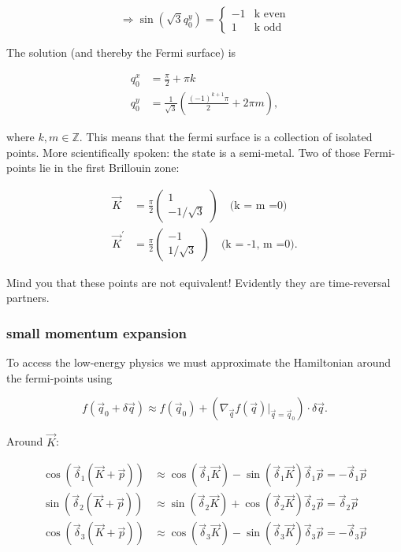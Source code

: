 \documentclass[../../../main.tex]{subfiles}
\begin{document}
\begin{equation}
	\Rightarrow \sin(\sqrt{3}q_0^y) = 
	\begin{cases}
		-1 & \text{k even} \\
		1 & \text{k odd}
	\end{cases}
\end{equation}


The solution (and thereby the Fermi surface) is 

\begin{align}
	q_0^x &= \frac{\pi}{2} + \pi k \\
	q_0^y &= \frac{1}{\sqrt{3}}\left(\frac{(-1)^{k+1}\pi}{2} + 2 \pi m\right),
\end{align}

where $k, m \in \mathbb{Z}$. This means that the fermi surface is a collection of isolated points. More scientifically spoken: the state is a semi-metal. Two of those Fermi-points lie in the first Brillouin zone:


\begin{align}
	\vec{K} &= \frac{\pi}{2} 
	\begin{pmatrix}
		1 \\
		-1/\sqrt{3}
	\end{pmatrix} \quad \text{(k = m =0)} \\
	\vec{K}^\prime &= \frac{\pi}{2}
	\begin{pmatrix}
		-1 \\
		1/\sqrt{3}
	\end{pmatrix} \quad \text{(k = -1, m =0)}.
\end{align}

Mind you that these points are not equivalent! Evidently they are time-reversal partners. 

\subsubsection{small momentum expansion}

To access the low-energy physics we must approximate the Hamiltonian around the fermi-points using

\begin{equation}
	f\left(\vec{q}_0 + \delta \vec{q}\right) \approx f(\vec{q}_0) + \left(\nabla_{\vec{q}}f(\vec{q})\rvert_{\vec{q}=\vec{q}_0}\right)\cdot\delta\vec{q}.
\end{equation}

Around $\vec{K}$:

\begin{align}
	\cos(\vec{\delta}_1(\vec{K} + \vec{p})) &\approx \cos(\vec{\delta}_1\vec{K}) - \sin(\vec{\delta}_1\vec{K})\vec{\delta}_1\vec{p} = - \vec{\delta}_1\vec{p}\\
	\sin(\vec{\delta}_2(\vec{K} + \vec{p})) &\approx \sin(\vec{\delta}_2\vec{K}) + \cos(\vec{\delta}_2\vec{K}) \vec{\delta}_2\vec{p} = \vec{\delta}_2\vec{p} \\
	\cos(\vec{\delta}_3(\vec{K} + \vec{p})) &\approx \cos(\vec{\delta}_3\vec{K}) - \sin(\vec{\delta}_3\vec{K}) \vec{\delta}_3\vec{p} = - \vec{\delta}_3\vec{p}
\end{align}
\end{document}
